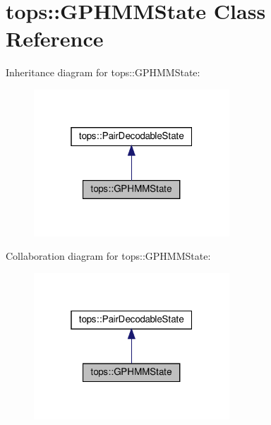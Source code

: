 \hypertarget{classtops_1_1GPHMMState}{}\section{tops\+:\+:G\+P\+H\+M\+M\+State Class Reference}
\label{classtops_1_1GPHMMState}


Inheritance diagram for tops\+:\+:G\+P\+H\+M\+M\+State\+:
\nopagebreak
\begin{figure}[H]
\begin{center}
\leavevmode
\includegraphics[width=208pt]{classtops_1_1GPHMMState__inherit__graph}
\end{center}
\end{figure}


Collaboration diagram for tops\+:\+:G\+P\+H\+M\+M\+State\+:
\nopagebreak
\begin{figure}[H]
\begin{center}
\leavevmode
\includegraphics[width=208pt]{classtops_1_1GPHMMState__coll__graph}
\end{center}
\end{figure}
